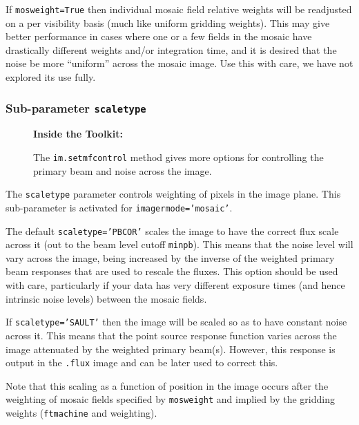 If {\tt mosweight=True} then individual mosaic field relative weights
will be readjusted on a per visibility basis (much like uniform
gridding weights).  This may give better performance in cases where
one or a few fields in the mosaic have drastically different weights
and/or integration time, and it is desired that the noise be more
``uniform'' across the mosaic image.  Use this with care, we have
not explored its use fully.

\subsubsection{Sub-parameter {\tt scaletype} }
\label{section:im.clean.imagermode.scaletype}

\begin{wrapfigure}{r}{2.5in}
  \begin{boxedminipage}{2.5in}
     \centerline{\bf Inside the Toolkit:}
     The {\tt im.setmfcontrol} method gives more options for
     controlling the primary beam and noise across the image.
  \end{boxedminipage}
\end{wrapfigure}

The {\tt scaletype} parameter controls weighting of pixels in the 
image plane.  This sub-parameter is activated for {\tt imagermode='mosaic'}.

The default {\tt scaletype='PBCOR'} scales the
image to have the correct flux scale across it (out to the beam
level cutoff {\tt minpb}).  This means that the noise level will
vary across the image, being increased by the inverse of the 
weighted primary beam responses that are used to rescale the
fluxes.  This option should
be used with care, particularly if your data has very different exposure
times (and hence intrinsic noise levels) between the mosaic fields.

If {\tt scaletype='SAULT'} then the image will be scaled so as to have
constant noise across it.  This means that the point source response
function varies across the image attenuated by the weighted primary
beam(s).  However, this response is output in the {\tt .flux} image
and can be later used to correct this.

Note that this scaling as a function of position in the image occurs
after the weighting of mosaic fields specified by {\tt mosweight}
and implied by the gridding weights ({\tt ftmachine} and {weighting}).

